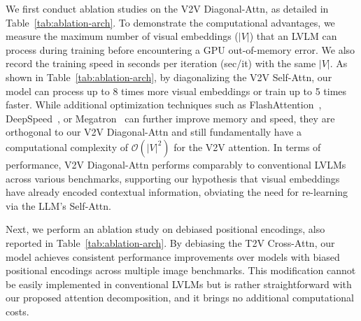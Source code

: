 

We first conduct ablation studies on the V2V Diagonal-Attn, as detailed in Table~\ref{tab:ablation-arch}.
To demonstrate the computational advantages, we measure the maximum number of visual embeddings ($|V|$) that an LVLM can process during training before encountering a GPU out-of-memory error.
We also record the training speed in seconds per iteration (sec/it) with the same $|V|$.
As shown in Table~\ref{tab:ablation-arch}, by diagonalizing the V2V Self-Attn, our model can process up to 8 times more visual embeddings or train up to 5 times faster.
While additional optimization techniques such as FlashAttention~\citep{dao2022flashattention}, DeepSpeed~\citep{rasley2020deepspeed}, or Megatron~\citep{shoeybi2019megatron} can further improve memory and speed, they are orthogonal to our V2V Diagonal-Attn and still fundamentally have a computational complexity of $\mathcal{O}(|V|^2)$ for the V2V attention.
In terms of performance, V2V Diagonal-Attn performs comparably to conventional LVLMs across various benchmarks, supporting our hypothesis that visual embeddings have already encoded contextual information, obviating the need for re-learning via the LLM's Self-Attn.


Next, we perform an ablation study on debiased positional encodings, also reported in Table~\ref{tab:ablation-arch}.
By debiasing the T2V Cross-Attn, our \method{} model achieves consistent performance improvements over models with biased positional encodings across multiple image benchmarks.
This modification cannot be easily implemented in conventional LVLMs but is rather straightforward with our proposed attention decomposition, and it brings no additional computational costs.

